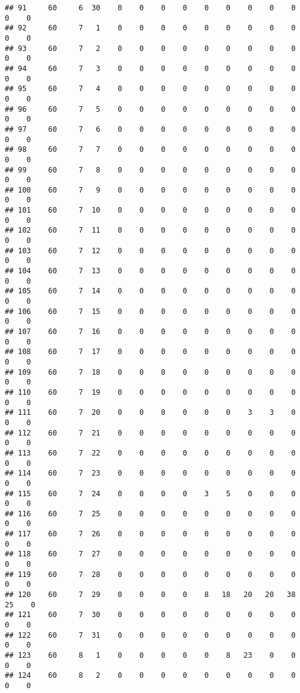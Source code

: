 \documentclass[]{article}
\begin{document}
\begin{verbatim}
## 91     60     6  30    0    0    0    0    0    0    0    0    0    0    0
## 92     60     7   1    0    0    0    0    0    0    0    0    0    0    0
## 93     60     7   2    0    0    0    0    0    0    0    0    0    0    0
## 94     60     7   3    0    0    0    0    0    0    0    0    0    0    0
## 95     60     7   4    0    0    0    0    0    0    0    0    0    0    0
## 96     60     7   5    0    0    0    0    0    0    0    0    0    0    0
## 97     60     7   6    0    0    0    0    0    0    0    0    0    0    0
## 98     60     7   7    0    0    0    0    0    0    0    0    0    0    0
## 99     60     7   8    0    0    0    0    0    0    0    0    0    0    0
## 100    60     7   9    0    0    0    0    0    0    0    0    0    0    0
## 101    60     7  10    0    0    0    0    0    0    0    0    0    0    0
## 102    60     7  11    0    0    0    0    0    0    0    0    0    0    0
## 103    60     7  12    0    0    0    0    0    0    0    0    0    0    0
## 104    60     7  13    0    0    0    0    0    0    0    0    0    0    0
## 105    60     7  14    0    0    0    0    0    0    0    0    0    0    0
## 106    60     7  15    0    0    0    0    0    0    0    0    0    0    0
## 107    60     7  16    0    0    0    0    0    0    0    0    0    0    0
## 108    60     7  17    0    0    0    0    0    0    0    0    0    0    0
## 109    60     7  18    0    0    0    0    0    0    0    0    0    0    0
## 110    60     7  19    0    0    0    0    0    0    0    0    0    0    0
## 111    60     7  20    0    0    0    0    0    0    3    3    0    0    0
## 112    60     7  21    0    0    0    0    0    0    0    0    0    0    0
## 113    60     7  22    0    0    0    0    0    0    0    0    0    0    0
## 114    60     7  23    0    0    0    0    0    0    0    0    0    0    0
## 115    60     7  24    0    0    0    0    3    5    0    0    0    0    0
## 116    60     7  25    0    0    0    0    0    0    0    0    0    0    0
## 117    60     7  26    0    0    0    0    0    0    0    0    0    0    0
## 118    60     7  27    0    0    0    0    0    0    0    0    0    0    0
## 119    60     7  28    0    0    0    0    0    0    0    0    0    0    0
## 120    60     7  29    0    0    0    0    8   18   20   20   38   25    0
## 121    60     7  30    0    0    0    0    0    0    0    0    0    0    0
## 122    60     7  31    0    0    0    0    0    0    0    0    0    0    0
## 123    60     8   1    0    0    0    0    0    8   23    0    0    0    0
## 124    60     8   2    0    0    0    0    0    0    0    0    0    0    0

\end{verbatim}
\end{document}
